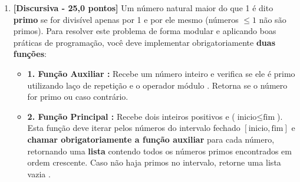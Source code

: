 \begin{enumerate}[label=\textbf{Q\arabic*.}, start=1]
\begin{itemize}[leftmargin=*]
    \item \textbf{Protótipo:}\newline {}\\\\\\
    \item \textbf{Exemplos de Teste:}\newline
     $\rightarrow$ \newline
     $\rightarrow$ \newline
     $\rightarrow$ 
\end{itemize}



\vspace{0.5cm}

\item \textbf{[Discursiva - 25,0 pontos]} Um número natural maior do que 1 é dito \textbf{primo} se for divisível apenas por 1 e por ele mesmo (números $\le 1$ não são primos). Para resolver este problema de forma modular e aplicando boas práticas de programação, você deve implementar obrigatoriamente \textbf{duas funções}:

\begin{itemize}[leftmargin=*]
    \item \textbf{1. Função Auxiliar :}\newline
    Recebe um número inteiro e verifica se ele é primo utilizando laço de repetição e o operador módulo \code{\%}. Retorna  se o número for primo ou  caso contrário.
    \item \textbf{2. Função Principal :}\newline
    Recebe dois inteiros positivos  e  ($\text{inicio} \le \text{fim}$). Esta função deve iterar pelos números do intervalo fechado $[\text{inicio}, \text{fim}]$ e \textbf{chamar obrigatoriamente a função auxiliar } para cada número, retornando uma \textbf{lista} contendo todos os números primos encontrados em ordem crescente. Caso não haja primos no intervalo, retorne uma lista vazia \code{[]}.
\end{itemize}


\end{enumerate}

